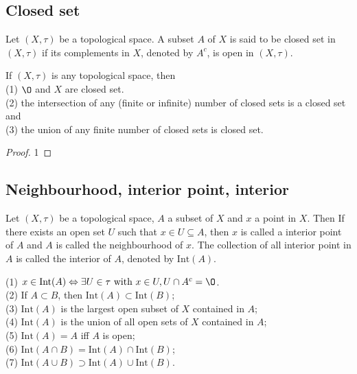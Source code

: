 \subsection{Closed set}
\begin{definition}{}{}
    Let $(X,\tau)$ be a topological space. 
    A subset $A$ of $X$ is said to be closed set in $(X,\tau)$ if its complements in $X$, denoted by $A^c$, is open in $(X,\tau)$.
\end{definition}

\begin{proposition}{}{}
    If $(X,\tau)$ is any topological space, then\\
    (1) $\O$ and $X$ are closed set.\\
    (2) the intersection of any (finite or infinite) number of closed sets is a closed set and\\
    (3) the union of any finite number of closed sets is closed set.
\end{proposition}

\begin{proof}
    1
\end{proof}
\subsection{Neighbourhood, interior point, interior}
\begin{definition}{}{}
    Let $(X,\tau)$ be a topological space, $A$ a subset of $X$ and $x$ a point in $X$. Then
    If there exists an open set $U$ such that $x\in U\subseteq A$, then $x$ is called a interior point of $A$ and
    $A$ is called the neighbourhood of $x$. The collection of all interior point in $A$ is called the interior of $A$, denoted by $\text{Int}(A)$.
\end{definition}

\begin{proposition}{}{}
    (1) $x\in \text{Int}(A) \Leftrightarrow \exists U\in \tau \text{ with } x\in U, U\cap A^c=\O$. \\
    (2) If $A\subset B$, then $\text{Int}(A)\subset \text{Int}(B)$;\\
    (3) $\text{Int}(A)$ is the largest open subset of $X$ contained in $A$;\\
    (4) $\text{Int}(A)$ is the union of all open sets of $X$ contained in $A$;\\
    (5) $\text{Int}(A)=A$ iff $A$ is open;\\
    (6) $\text{Int}(A\cap B) = \text{Int}(A)\cap \text{Int}(B)$;\\ 
    (7) $\text{Int}(A\cup B) \supset\text{Int}(A)\cup \text{Int}(B)$.
\end{proposition}




